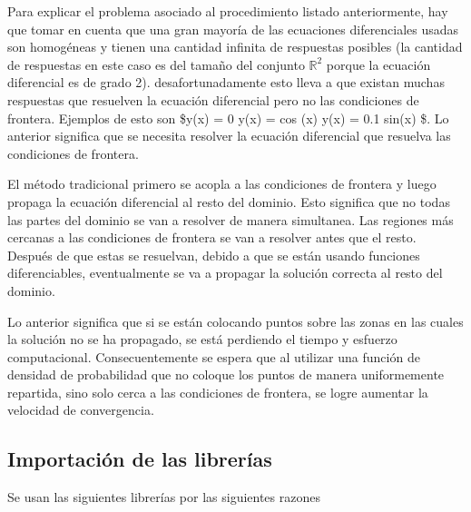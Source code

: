 \documentclass[11pt]{article}
\begin{document}
Para explicar el problema asociado al procedimiento listado
anteriormente, hay que tomar en cuenta que una gran mayoría de las
ecuaciones diferenciales usadas son homogéneas y tienen una cantidad
infinita de respuestas posibles (la cantidad de respuestas en este caso
es del tamaño del conjunto \(\mathbb{R}^2\) porque la ecuación
diferencial es de grado 2). desafortunadamente esto lleva a que existan
muchas respuestas que resuelven la ecuación diferencial pero no las
condiciones de frontera. Ejemplos de esto son \$y(x) = 0 \text{ ; } y(x)
= cos (x) \text{ ; } y(x) = 0.1 sin(x) \$. Lo anterior significa que se
necesita resolver la ecuación diferencial que resuelva las condiciones
de frontera.

El método tradicional primero se acopla a las condiciones de frontera y
luego propaga la ecuación diferencial al resto del dominio. Esto
significa que no todas las partes del dominio se van a resolver de
manera simultanea. Las regiones más cercanas a las condiciones de
frontera se van a resolver antes que el resto. Después de que estas se
resuelvan, debido a que se están usando funciones diferenciables,
eventualmente se va a propagar la solución correcta al resto del
dominio.

Lo anterior significa que si se están colocando puntos sobre las zonas
en las cuales la solución no se ha propagado, se está perdiendo el
tiempo y esfuerzo computacional. Consecuentemente se espera que al
utilizar una función de densidad de probabilidad que no coloque los
puntos de manera uniformemente repartida, sino solo cerca a las
condiciones de frontera, se logre aumentar la velocidad de convergencia.

    \hypertarget{importaciuxf3n-de-las-libreruxedas}{%
\subsection{Importación de las
librerías}\label{importaciuxf3n-de-las-libreruxedas}}

Se usan las siguientes librerías por las siguientes razones
\end{document}
